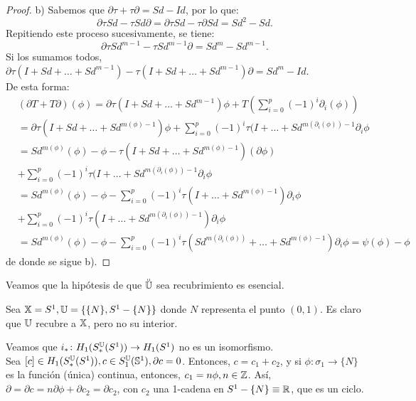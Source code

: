 \begin{proof}
  b) Sabemos que $\partial \tau + \tau \partial = Sd - Id$, por lo que:
  \[ \partial \tau Sd - \tau Sd \partial = \partial \tau Sd - \tau \partial Sd = Sd^2 - Sd. \]
  Repitiendo este proceso sucesivamente, se tiene:
  \[ \partial \tau Sd^{m - 1} - \tau Sd^{m-1} \partial = Sd^m - Sd^{m-1}. \]
  Si los sumamos todos, $\partial \tau(I + Sd + \dots + Sd^{m-1}) - \tau(I + Sd + \dots + Sd^{m-1}) \partial = Sd^m - Id$. \\
  De esta forma:
  \begin{align*}
    &(\partial T + T \partial)(\phi) = \partial \tau(I + Sd + \dots + Sd^{m-1}) \phi + T(\sum\limits_{i = 0}^p (-1)^i \partial_i(\phi)) \\
    &= \partial \tau(I + Sd + \dots + Sd^{m(\phi)-1}) \phi + \sum\limits_{i = 0}^p (-1)^i \tau(I + \dots + Sd^{m(\partial_i(\phi)) - 1} \partial_i \phi \\
    &= Sd^{m(\phi)}(\phi) - \phi - \tau(I + Sd + \dots + Sd^{m(\phi)-1})(\partial \phi)  \\
    &+ \sum\limits_{i = 0}^p (-1)^i \tau(I + \dots + Sd^{m(\partial_i(\phi)) - 1} \partial_i \phi \\
    &= Sd^{m(\phi)}(\phi) - \phi - \sum\limits_{i = 0}^p (-1)^i \tau(I + \dots + Sd^{m(\phi) - 1}) \partial_i \phi \\
    &+ \sum\limits_{i = 0}^p (-1)^i \tau(I + \dots + Sd^{m(\partial_i(\phi)) - 1}) \partial_i \phi \\
    &= Sd^{m(\phi)}(\phi) - \phi - \sum\limits_{i = 0}^p (-1)^i \tau(Sd^{m(\partial_i(\phi))} + \dots + Sd^{m(\phi) - 1}) \partial_i \phi = \psi(\phi) - \phi
  \end{align*}
  de donde se sigue b).
\end{proof}

Veamos que la hipótesis de que $\interior{\U}$ sea recubrimiento es esencial.

Sea ${\mathbb X} = S^1, {\mathbb U} = \{\{N\}, S^1 - \{N\}\}$ donde $N$ representa el punto $(0, 1)$. Es claro que ${\mathbb U}$ recubre a ${\mathbb X}$, pero no su interior.

Veamos que $i_* \colon H_1(S_*^{\mathbb U}(S^1)) \to H_1(S^1)$ no es un isomorfismo. \\
Sea $[c] \in H_1(S_*^{\mathbb U}(S^1)), c \in S_1^{\mathbb U}({\mathbb S}^1), \partial c = 0$. Entonces, $c = c_1 + c_2$, y si $\phi \colon \sigma_1 \to \{N\}$ es la función
(única) continua, entonces, $c_1 = n\phi, n \in \mathbb{Z}$. Así, $\partial = \partial c = n \partial \phi + \partial c_2 = \partial c_2$, con $c_2$ una
1-cadena en $S^1 - \{N\} \equiv \mathbb{R}$, que es un ciclo.

